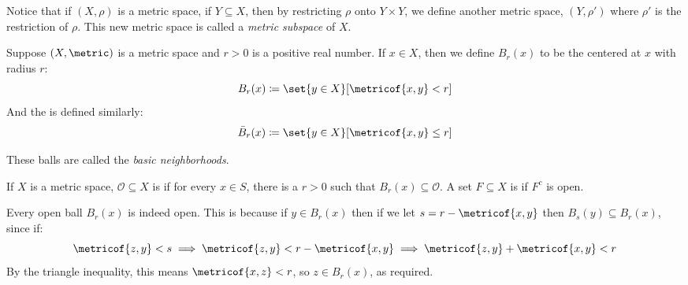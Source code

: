 \documentclass[10pt]{article}
\begin{document}


\bigskip


Notice that if $(X,\rho)$ is a metric space, if $Y\subseteq X$, then by restricting $\rho$ onto $Y\times Y$, we define another metric space, $(Y,\rho')$ where $\rho'$ is
the restriction of $\rho$.
This new metric space is called a \emph{metric subspace} of $X$.

\begin{defn*}

    Suppose $(X,\metric)$ is a metric space and $r>0$ is a positive real number.
    If $x\in X$, then we define $B_r(x)$ to be the  centered at $x$ with radius $r$:
    \[ B_r(x) \coloneqq \set{y\in X}[\metricof{x,y}<r] \]
    And the  is defined similarly:
    \[ \bar B_r(x) \coloneqq \set{y\in X}[\metricof{x,y}\leq r] \]

\end{defn*}

These balls are called the \emph{basic neighborhoods}.

\def\openset{\mathcal{O}}

\begin{defn*}

    If $X$ is a metric space, $\openset\subseteq X$ is  if for every $x\in S$, there is a $r>0$ such that $B_r(x)\subseteq\openset$.
    A set $F\subseteq X$ is  if $F^c$ is open.

\end{defn*}

\begin{exam}

    Every open ball $B_r(x)$ is indeed open.
    This is because if $y\in B_r(x)$ then if we let $s=r-\metricof{x,y}$ then $B_s(y)\subseteq B_r(x)$, since if:
    \[ \metricof{z,y} < s \implies \metricof{z,y} < r-\metricof{x,y} \implies \metricof{z,y} + \metricof{x,y} < r \]
    By the triangle inequality, this means $\metricof{x,z}<r$, so $z\in B_r(x)$, as required.

\end{exam}
\end{document}
